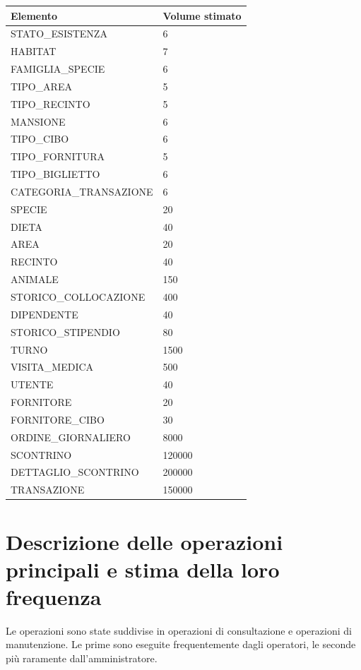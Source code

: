 \documentclass[12pt,a4paper]{report}
\begin{document}
\begin{longtable}{L{7cm} C{4cm}}
\toprule
\textbf{Elemento} & \textbf{Volume stimato} \\
\midrule
\endhead
STATO\_ESISTENZA & 6 \\
HABITAT & 7 \\
FAMIGLIA\_SPECIE & 6 \\
TIPO\_AREA & 5 \\
TIPO\_RECINTO & 5 \\
MANSIONE & 6 \\
TIPO\_CIBO & 6 \\
TIPO\_FORNITURA & 5 \\
TIPO\_BIGLIETTO & 6 \\
CATEGORIA\_TRANSAZIONE & 6 \\
SPECIE & 20 \\
DIETA & 40 \\
AREA & 20 \\
RECINTO & 40 \\
ANIMALE & 150 \\
STORICO\_COLLOCAZIONE & 400 \\
DIPENDENTE & 40 \\
STORICO\_STIPENDIO & 80 \\
TURNO & 1500 \\
VISITA\_MEDICA & 500 \\
UTENTE & 40 \\
FORNITORE & 20 \\
FORNITORE\_CIBO & 30 \\
ORDINE\_GIORNALIERO & 8000 \\
SCONTRINO & 120000 \\
DETTAGLIO\_SCONTRINO & 200000 \\
TRANSAZIONE & 150000 \\
\bottomrule
\end{longtable}

\section{Descrizione delle operazioni principali e stima della loro frequenza}

Le operazioni sono state suddivise in operazioni di consultazione e operazioni di
manutenzione. Le prime sono eseguite frequentemente dagli operatori, le seconde
più raramente dall'amministratore.
\end{document}
